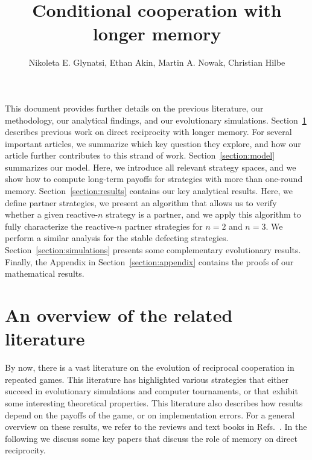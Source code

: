 \documentclass[9pt,twoside,lineno]{pnas-new}
\title{Conditional cooperation with longer memory}
\author{Nikoleta E. Glynatsi, Ethan Akin, Martin A. Nowak, Christian Hilbe}
\theoremstyle{plainCl1}
\theoremstyle{plainCl2}
\begin{document}
\maketitle

\SItext

This document provides further details on the previous literature, our methodology, our analytical
findings, and our evolutionary simulations.
Section~\ref{section:literature} describes previous work on direct reciprocity with longer memory. 
For several important articles, we summarize which key question they explore, and how our article further contributes to this strand of work. 
Section~\ref{section:model} summarizes our model. 
Here, we introduce all relevant strategy spaces, and we show how to compute long-term payoffs for strategies with more than one-round memory. 
Section~\ref{section:results} contains our key analytical results. 
Here, we define partner strategies, we present an algorithm that allows us to verify whether a given reactive-$n$ strategy is a partner, and we apply this algorithm to fully characterize the reactive-$n$ partner strategies for $n\!=\!2$ and $n\!=\!3$.
We perform a similar analysis for the stable defecting strategies. 
Section~\ref{section:simulations} presents some complementary evolutionary results. 
Finally, the Appendix in Section~\ref{section:appendix} contains the proofs of our mathematical results. 




\section{An overview of the related literature}\label{section:literature}

By now, there is a vast literature on the evolution of reciprocal cooperation in repeated games. 
This literature has highlighted various strategies that either succeed in evolutionary simulations and computer tournaments, or that exhibit some interesting theoretical properties. 
This literature also describes how results depend on the payoffs of the game, or on implementation errors. 
For a general overview on these results, we refer to the reviews and text books in Refs.~\cite{axelrod:book:1984,nowak:book:2006,sigmund2010,hilbe:Nature:2018,Glynatsi:HSSC:2021}. 
In the following we discuss some key papers that discuss the role of memory on direct reciprocity.
\end{document}
